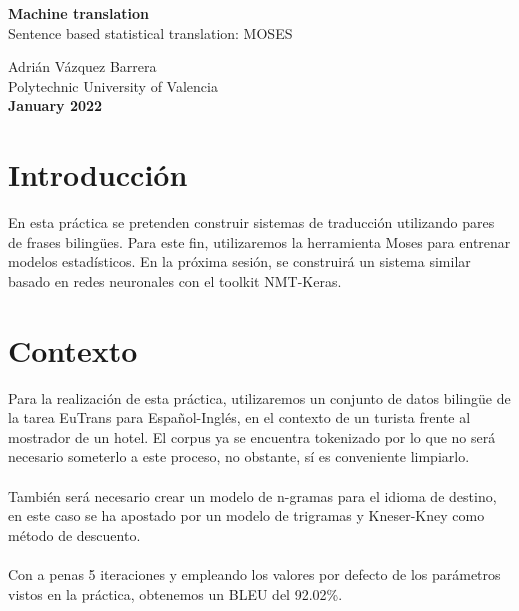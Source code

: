 \documentclass[12pt]{article}
\begin{document}
\begin{titlepage}
    \begin{center}
        \vspace*{1cm}
         \textbf{\huge Machine translation} \\        
        \vspace{0.25cm}
         {\LARGE Sentence based statistical translation: MOSES }\\
 
        \vfill
        
        

        Adrián Vázquez Barrera \\
        \vspace{0.25cm}
        Polytechnic University of Valencia\\
        \vspace{0.25cm}
        \textbf{January 2022}
             
    \end{center}
 \end{titlepage}

\newpage

\section*{Introducción}
En esta práctica se pretenden construir sistemas de traducción utilizando pares de 
frases bilingües.  Para este fin, utilizaremos la herramienta 
Moses para entrenar modelos estadísticos. En la próxima sesión, se construirá un sistema similar basado en 
redes neuronales con el toolkit NMT-Keras.

\section*{Contexto}
Para la realización de esta práctica, utilizaremos un conjunto de datos bilingüe de la tarea EuTrans para Español-Inglés, en el contexto de un turista frente al mostrador de un hotel.
El corpus ya se encuentra tokenizado por lo que no será necesario someterlo a este proceso, no obstante, sí es conveniente limpiarlo.
\\\\
También será necesario crear un modelo de n-gramas para el idioma de destino, en este caso se ha apostado por un modelo de trigramas y Kneser-Kney como método de descuento.
\\\\
Con a penas 5 iteraciones y empleando los valores por defecto de los parámetros vistos en la práctica, obtenemos un BLEU del 92.02\%. 
\end{document}
